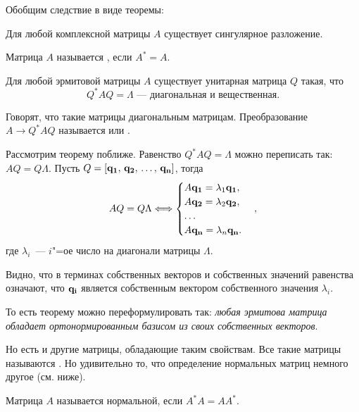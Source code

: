 Обобщим следствие в виде теоремы:
\begin{theorem}
    Для любой комплексной матрицы $A$ существует сингулярное разложение.
\end{theorem}

\begin{definition}
    Матрица $A$ называется , если $A^*=A$.
\end{definition}

\begin{theorem}
    Для любой эрмитовой матрицы $A$ существует унитарная матрица $Q$ такая, что
    \[
        Q^*AQ=\Lambda\text{~--- диагональная и вещественная.}
    \]

    Говорят, что такие матрицы  диагональным матрицам. Преобразование
    $A\rightarrow Q^*AQ$ называется  или .
\end{theorem}

Рассмотрим теорему поближе. Равенство $Q^*AQ=\Lambda$ можно переписать так: $AQ=Q\Lambda$. Пусть
$Q=[\mathbf{q_1},\, \mathbf{q_2},\,\ldots,\,\mathbf{q_n}]$, тогда
\[
    AQ=Q\Lambda\Longleftrightarrow \begin{cases}
        A\mathbf{q_1}=\lambda_1\mathbf{q_1}, \\
        A\mathbf{q_2}=\lambda_2\mathbf{q_2}, \\
        \ldots                           \\
        A\mathbf{q_n}=\lambda_n\mathbf{q_n}. \\
    \end{cases},
\]
где $\lambda_i$~--- $i$"=ое число на диагонали матрицы $\Lambda$.

Видно, что в терминах собственных векторов и собственных значений равенства означают, что $\mathbf{q_i}$
является собственным вектором собственного значения $\lambda_i$.

То есть теорему можно переформулировать так: \textit{любая эрмитова матрица обладает ортонормированным
    базисом из своих собственных векторов}.

\begin{remark}
    Но есть и другие матрицы, обладающие таким свойствам. Все такие матрицы называются
    . Но удивительно то, что определение нормальных матриц немного другое (см. ниже).
\end{remark}

\begin{definition}
    Матрица $A$ называется нормальной, если $A^*A=AA^*$.
\end{definition}

